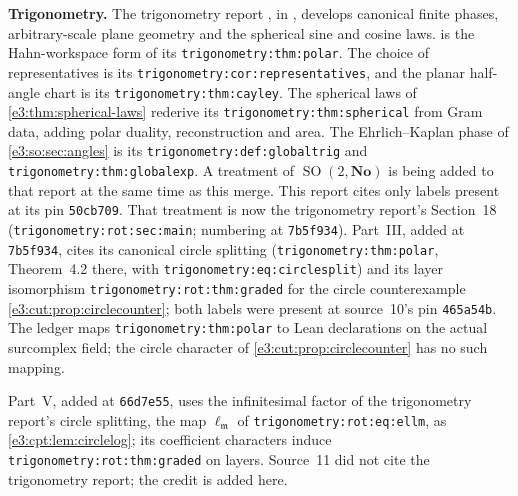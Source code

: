 \documentclass[11pt,letterpaper]{article}
\numberwithin{equation}{section}
\theoremstyle{definition}
\theoremstyle{remark}
\newcommand{\No}{\mathbf{No}}
\newcommand{\mm}{\mathfrak m}
\newcommand{\SO}{\operatorname{SO}}
\begin{document}
\textbf{Trigonometry.} The trigonometry report \cite{RepoTrig}, in
, develops canonical finite phases,
arbitrary-scale plane geometry and the spherical sine and cosine laws.  is the Hahn-workspace form of its
\texttt{trigonometry:thm:polar}. The choice of representatives is its
\texttt{trigonometry:cor:representatives}, and the planar half-angle chart is its
\texttt{trigonometry:thm:cayley}. The spherical laws of
\cref{e3:thm:spherical-laws} rederive its \texttt{trigonometry:thm:spherical}
from Gram data, adding polar duality, reconstruction and area. The
Ehrlich--Kaplan phase of \cref{e3:so:sec:angles} is its
\texttt{trigonometry:def:globaltrig} and \texttt{trigonometry:thm:globalexp}. A
treatment of $\SO(2,\No)$ is being added to that report at the same time as this
merge. This report cites only labels present at its pin \texttt{50cb709}.
That treatment is now the trigonometry report's Section~18
(\texttt{trigonometry:rot:sec:main}; numbering at \texttt{7b5f934}). Part~III,
added at \texttt{7b5f934}, cites its canonical circle splitting
(\texttt{trigonometry:thm:polar}, Theorem~4.2 there, with
\texttt{trigonometry:eq:circlesplit}) and its layer isomorphism
\texttt{trigonometry:rot:thm:graded} for the circle counterexample
\cref{e3:cut:prop:circlecounter}; both labels were present at source~10's pin
\texttt{465a54b}. The ledger maps \texttt{trigonometry:thm:polar} to Lean
declarations on the actual surcomplex field; the circle character of
\cref{e3:cut:prop:circlecounter} has no such mapping.

Part~V, added at \texttt{66d7e55}, uses the infinitesimal factor of the
trigonometry report's circle splitting, the map
$\ell_{\mm}$ of \texttt{trigonometry:rot:eq:ellm}, as
\cref{e3:cpt:lem:circlelog}; its coefficient characters induce
\texttt{trigonometry:rot:thm:graded} on layers. Source~11 did not cite the
trigonometry report; the credit is added here.
\end{document}
